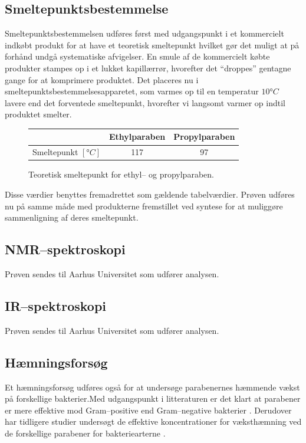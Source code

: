     \subsection{Smeltepunktsbestemmelse}
    Smeltepunktsbestemmelsen udføres først med udgangspunkt i et kommercielt indkøbt produkt for at have et teoretisk smeltepunkt hvilket gør det muligt at på forhånd undgå systematiske afvigelser. En smule af de kommercielt købte produkter stampes op i et lukket kapillærrør, hvorefter det ``droppes'' gentagne gange for at komprimere produktet. Det placeres nu i smeltepunktsbestemmelsesapparetet, som varmes op til en temperatur $10\si{\degree C}$ lavere end det forventede smeltepunkt, hvorefter vi langsomt varmer op indtil produktet smelter.
    \begin{figure}[H]\centering
        \caption{Teoretisk smeltepunkt for ethyl-- og propylparaben.}
        \begin{tabular}{ccc}
            \toprule
            & Ethylparaben & Propylparaben \\
            \midrule
            Smeltepunkt $\left[\si{\degree C}\right]$ & 117 & 97 \\
            \bottomrule
        \end{tabular}
    \end{figure}
    Disse værdier benyttes fremadrettet som gældende tabelværdier. Prøven udføres nu på samme måde med produkterne fremstillet ved syntese for at muliggøre sammenligning af deres smeltepunkt.

    \subsection{NMR--spektroskopi}
    Prøven sendes til Aarhus Universitet som udfører analysen.

    \subsection{IR--spektroskopi}
    Prøven sendes til Aarhus Universitet som udfører analysen.

    \subsection{Hæmningsforsøg}
    Et hæmningsforsøg udføres også for at undersøge parabenernes hæmmende vækst på forskellige bakterier.Med udgangspunkt i litteraturen er det klart at parabener er mere effektive mod Gram--positive end Gram--negative bakterier \parencite{Joao2021}. Derudover har tidligere studier undersøgt de effektive koncentrationer for væksthæmning ved de forskellige parabener for bakteriearterne \parencite{Wies2019}. 


